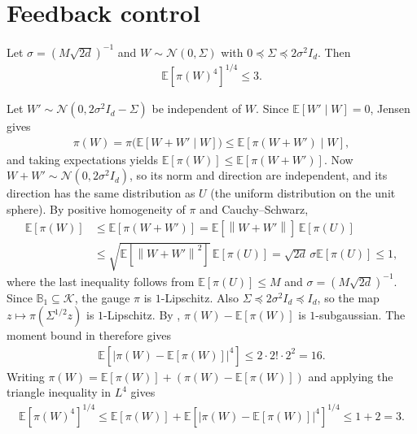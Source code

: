 \documentclass[12pt,cleveref]{jmlr}
\renewenvironment{proof}[1][\proofname]
{\par\noindent{\bfseries\upshape #1\ }}
{\jmlrQED}
\newcommand{\E}{\mathbb E}
\newcommand{\K}{\mathcal K}
\newcommand{\N}{\mathcal N}
\newcommand{\1}{\mathbf 1}
\newcommand{\norm}[1]{\left\lVert #1\right\rVert}
\newcommand{\alireza}[1]{\todo[color=blue!20,size=\tiny]{Alireza: #1}}
\begin{document}
\section{Feedback control}
\label{app:feedback}

\begin{lemma}
    \label{lem:gaussian-gauge-fourth-moment}
    Let $\sigma=(M\sqrt{2d})^{-1}$ and $W\sim\N(0,\Sigma)$ with
    $0\preceq\Sigma\preceq2\sigma^2I_d$. Then \alireza{checked.}
    \begin{align}
        \E[\pi(W)^4]^{1/4}\leq3.
    \end{align}
\end{lemma}
\begin{proof}
    Let $W'\sim\N(0,2\sigma^2I_d-\Sigma)$ be independent of $W$.
    Since $\E[W'\mid W]=0$, Jensen gives
    \begin{align}
        \pi(W)
        =\pi\bigl(\E[W+W'\mid W]\bigr)
        \leq\E[\pi(W+W')\mid W],
    \end{align}
    and taking expectations yields $\E[\pi(W)]\leq\E[\pi(W+W')]$.
    Now $W+W'\sim\N(0,2\sigma^2I_d)$, so its norm and direction
    are independent, and its direction has the same distribution as $U$ (the uniform distribution on the unit sphere).
    By positive homogeneity of $\pi$ and Cauchy--Schwarz,
    \begin{align}
        \E[\pi(W)] & \leq\E[\pi(W+W')]
        =\E[\norm{W+W'}]\,\E[\pi(U)]                          \\
        & \leq\sqrt{\E[\norm{W+W'}^2]}\,\E[\pi(U)]
        =\sqrt{2d}\,\sigma\E[\pi(U)]\leq1,
    \end{align}
    where the last inequality follows from $\E[\pi(U)]\leq M$
    and $\sigma=(M\sqrt{2d})^{-1}$.
    Since $\mathbb B_1\subseteq\K$, the gauge $\pi$ is $1$-Lipschitz.
    Also $\Sigma\preceq2\sigma^2I_d\preceq I_d$, so
    the map $z\mapsto\pi(\Sigma^{1/2}z)$ is $1$-Lipschitz.
    By \citet[Theorem~5.6]{boucheron2013concentration},
    $\pi(W)-\E[\pi(W)]$ is $1$-subgaussian.
    The moment bound in \citet[Theorem~2.1]{boucheron2013concentration}
    therefore gives
    \begin{align}
        \E\left[|\pi(W)-\E[\pi(W)]|^4\right]
        \leq2\cdot2!\cdot2^2=16.
    \end{align}
    Writing $\pi(W)=\E[\pi(W)]+(\pi(W)-\E[\pi(W)])$
    and applying the triangle inequality in $L^4$ gives
    \begin{align}
        \E[\pi(W)^4]^{1/4}
        \leq\E[\pi(W)]
        +\E\left[|\pi(W)-\E[\pi(W)]|^4\right]^{1/4}
        \leq1+2=3.
    \end{align}
\end{proof}
\end{document}
